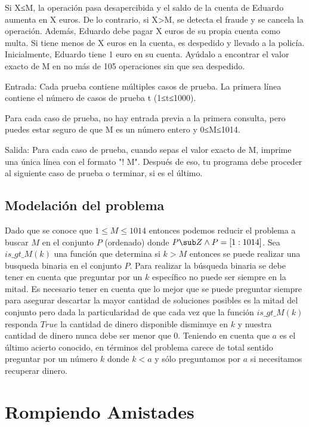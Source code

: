 \documentclass[
10pt, %
a4paper, %
oneside, %
headinclude,footinclude, %
BCOR5mm, %
]{scrartcl}
\begin{document}
Si X≤M, la operación pasa desapercibida y el saldo de la cuenta de Eduardo aumenta en X euros.  
De lo contrario, si X>M, se detecta el fraude y se cancela la operación. Además, Eduardo debe pagar X euros de su propia cuenta como multa. Si tiene menos de X euros en la cuenta, es despedido y llevado a la policía.  
Inicialmente, Eduardo tiene 1 euro en su cuenta. Ayúdalo a encontrar el valor exacto de M en no más de 105 operaciones sin que sea despedido.

Entrada:
Cada prueba contiene múltiples casos de prueba. La primera línea contiene el número de casos de prueba t (1≤t≤1000).

Para cada caso de prueba, no hay entrada previa a la primera consulta, pero puedes estar seguro de que M es un número entero y 0≤M≤1014.

Salida:
Para cada caso de prueba, cuando sepas el valor exacto de M, imprime una única línea con el formato "! M". Después de eso, tu programa debe proceder al siguiente caso de prueba o terminar, si es el último.


\subsection{Modelación del problema}

Dado que se conoce que $1 \leq M \leq 1014$ entonces podemos reducir el problema a buscar $M$ en el conjunto $P$ (ordenado) donde $P \sub Z \wedge P = [1:1014]$. Sea $is\_ gt\_ M(k)$ una función que determina si $k > M$ entonces se puede realizar una busqueda binaria en el conjunto $P$.
Para realizar la búsqueda binaria se debe tener en cuenta que preguntar por un $k$ específico no puede ser siempre en la mitad. Es necesario tener en cuenta que lo mejor que se puede preguntar siempre para asegurar descartar la mayor cantidad de soluciones posibles es la mitad del conjunto pero dada la particularidad de que cada vez que la función $is\_ gt\_ M(k)$ responda $True$ la cantidad de dinero disponible disminuye en $k$ y nuestra cantidad de dinero nunca debe  ser menor que $0$.
Teniendo en cuenta que $a$ es el último acierto conocido, en términos del problema carece de total sentido preguntar por un número $k$ donde $k<a$ y sólo preguntamos por $a$ si necesitamos recuperar dinero. 


\section{Rompiendo Amistades}
\end{document}
